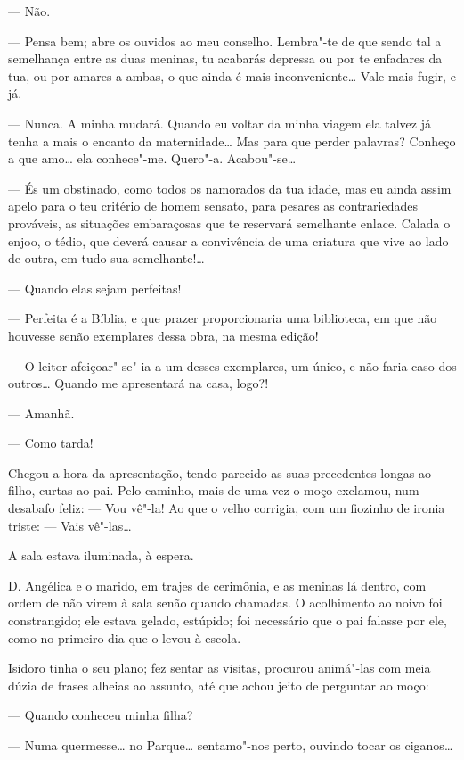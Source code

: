 --- Não.

--- Pensa bem; abre os ouvidos ao meu conselho. Lembra"-te de que sendo
tal a semelhança entre as duas meninas, tu acabarás depressa ou por te
enfadares da tua, ou por amares a ambas, o que ainda é mais
inconveniente\ldots{} Vale mais fugir, e já.

--- Nunca. A minha mudará. Quando eu voltar da minha viagem ela talvez
já tenha a mais o encanto da maternidade\ldots{} Mas para que perder
palavras? Conheço a que amo\ldots{} ela conhece"-me. Quero"-a. Acabou"-se\ldots{}

--- És um obstinado, como todos os namorados da tua idade, mas eu ainda
assim apelo para o teu critério de homem sensato, para pesares as
contrariedades prováveis, as situações embaraçosas que te reservará
semelhante enlace. Calada o enjoo, o tédio, que deverá causar a
convivência de uma criatura que vive ao lado de outra, em tudo sua
semelhante!\ldots{}

--- Quando elas sejam perfeitas!

--- Perfeita é a Bíblia, e que prazer proporcionaria uma biblioteca, em
que não houvesse senão exemplares dessa obra, na mesma edição!

--- O leitor afeiçoar"-se"-ia a um desses exemplares, um único, e não
faria caso dos outros\ldots{} Quando me apresentará na casa, logo?!

--- Amanhã.

--- Como tarda!

Chegou a hora da apresentação, tendo parecido as suas precedentes longas
ao filho, curtas ao pai. Pelo caminho, mais de uma vez o moço exclamou,
num desabafo feliz: --- Vou vê"-la! Ao que o velho corrigia, com um
fiozinho de ironia triste: --- Vais vê"-las\ldots{}

A sala estava iluminada, à espera.

D. Angélica e o marido, em trajes de cerimônia, e as meninas lá dentro,
com ordem de não virem à sala senão quando chamadas. O acolhimento ao
noivo foi constrangido; ele estava gelado, estúpido; foi necessário que
o pai falasse por ele, como no primeiro dia que o levou à escola.

Isidoro tinha o seu plano; fez sentar as visitas, procurou animá"-las com
meia dúzia de frases alheias ao assunto, até que achou jeito de
perguntar ao moço:

--- Quando conheceu minha filha?

--- Numa quermesse\ldots{} no Parque\ldots{} sentamo"-nos perto, ouvindo tocar os
ciganos\ldots{}

